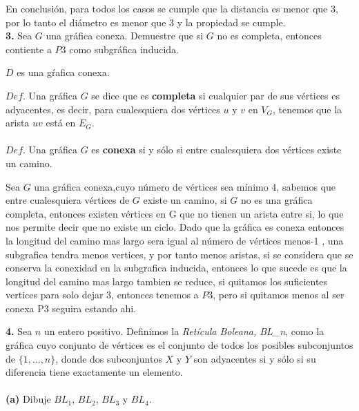 \documentclass[12pt]{article}
\begin{document}
En conclusión,  para todos los casos se cumple que la distancia es menor que 3, por lo tanto el diámetro es menor que 3 y la propiedad se cumple.\\

\vspace{1cm}
%
%
\textbf{3.} Sea $G$ una gráfica conexa. Demuestre que si $G$ no es completa, entonces contiente a $P3$ como subgráfica inducida.

\begin{tcolorbox}[title=\textbf{Hipotesis}, colback=red!15!white, colframe=black!]
    $D$ es una gŕafica conexa.
\end{tcolorbox}
\begin{tcolorbox}[title=\textbf{Definiciones}, colback=blue!15!white, colframe=black!]
    $Def$. Una gráfica $G$  se dice que es \textbf{completa} si cualquier par de sus vértices es adyacentes, es decir, para cualesquiera dos vértices $u$ y $v$ en $V_G$, tenemos que la arista $uv$ está en $E_G$.
    \\
    \\
    $Def$. Una gráfica $G$ es \textbf{conexa} si y sólo si entre cualesquiera dos vértices existe un camino.

\end{tcolorbox}

Sea $G$ una gráfica conexa,cuyo número de vértices sea mínimo 4,  sabemos que entre cualesquiera vértices de $G$ existe un camino, si $G$ no es una gráfica completa, entonces existen vértices en G que no tienen un arista entre si, lo que nos permite decir que no existe un ciclo.  Dado que la gráfica es conexa entonces la longitud del camino mas largo sera igual al número de vértices menos-1 , una subgrafica tendra menos vertices, y por tanto menos aristas, si se considera que se conserva la conexidad en la subgrafica inducida, entonces  lo que sucede es que la longitud del camino mas largo tambien se reduce, si quitamos los suficientes vertices para solo dejar 3, entonces tenemos a $P3$, pero si quitamos menos al ser conexa P3 seguira estando ahi.


\vspace{1cm}
%
%
\textbf{4.} Sea $n$ un entero positivo. Definimos la \textit{Retícula Boleana, BL\_n}, como
la gráfica cuyo conjunto de vértices es el conjunto de todos los posibles subconjuntos
de $\{1, ..., n\}$, donde dos subconjuntos $X$ y $Y$ son adyacentes si y sólo si su diferencia
tiene exactamente un elemento.\\
\\
\textbf{(a)} Dibuje $BL_1$, $BL_2$, $BL_3$ y $BL_4$.
\\
\end{document}
